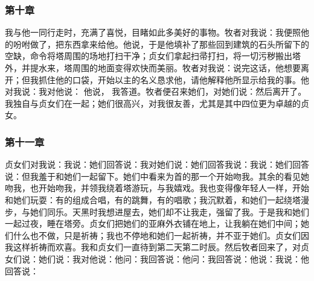 
\subsubsection{第十章}

我与他一同行走时，充满了喜悦，目睹如此多美好的事物。牧者对我说：我便照他的吩咐做了，把东西拿来给他。他说，于是他填补了那些回到建筑的石头所留下的空缺，命令将塔周围的场地打扫干净；贞女们拿起扫帚打扫，将一切污秽搬出塔外，并提水来，塔周围的地面变得欢快而美丽。牧者对我说：说完这话，他想要离开；但我抓住他的口袋，开始以主的名义恳求他，请他解释他所显示给我的事。他对我说：我对他说： 他说， 我答道。牧者便召来她们，对她们说：然后离开了。我独自与贞女们在一起；她们很高兴，对我很友善，尤其是其中四位更为卓越的贞女。\par


\subsubsection{第十一章}

贞女们对我说：我说：她们回答说：我对她们说：她们回答我说：我说：她们回答说：但我羞于和她们一起留下。她们中看来为首的那一个开始吻我。其余的看见她吻我，也开始吻我，并领我绕着塔游玩，与我嬉戏。我也变得像年轻人一样，开始和她们玩耍：有的组成合唱，有的跳舞，有的唱歌；我沉默着，和她们一起绕塔漫步，与她们同乐。天黑时我想进屋去，她们却不让我走，强留了我。于是我和她们一起过夜，睡在塔旁。贞女们把她们的亚麻外衣铺在地上，让我躺在她们中间；她们什么也不做，只是祈祷；我也不停地和她们一起祈祷，并不亚于她们。贞女们因我这样祈祷而欢喜。我和贞女们一直待到第二天第二时辰。然后牧者回来了，对贞女们说：她们说：我对他说：他问：我回答说：他问：我回答说：他说：我说：他回答说：\par

